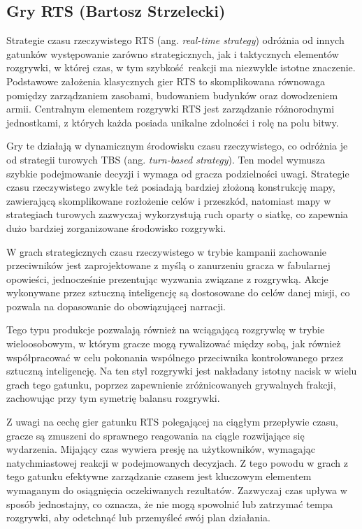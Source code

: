 \subsection{Gry RTS (Bartosz Strzelecki)}\label{ss:rts}
Strategie czasu rzeczywistego RTS (ang. \textit{real-time strategy}) odróżnia od innych gatunków występowanie zarówno strategicznych, jak i taktycznych
elementów rozgrywki, w której czas, w tym szybkość reakcji ma niezwykle istotne znaczenie. Podstawowe założenia klasycznych gier RTS to skomplikowana równowaga pomiędzy zarządzaniem zasobami, budowaniem budynków oraz
dowodzeniem armii. Centralnym elementem rozgrywki RTS jest zarządzanie różnorodnymi jednostkami, z których każda posiada unikalne zdolności i rolę na polu bitwy.

Gry te działają w dynamicznym środowisku czasu rzeczywistego, co odróżnia je od strategii turowych TBS (ang. \textit{turn-based strategy}). Ten model wymusza szybkie podejmowanie decyzji
i wymaga od gracza podzielności uwagi. Strategie czasu rzeczywistego zwykle też posiadają bardziej złożoną konstrukcję mapy, zawierającą skomplikowane
rozłożenie celów i przeszkód, natomiast mapy w strategiach turowych zazwyczaj wykorzystują ruch oparty o siatkę, co zapewnia dużo bardziej
zorganizowane środowisko rozgrywki.

W grach strategicznych czasu rzeczywistego w trybie kampanii zachowanie przeciwników jest zaprojektowane z myślą o zanurzeniu gracza w fabularnej opowieści, jednocześnie
prezentując wyzwania związane z rozgrywką. Akcje wykonywane przez sztuczną inteligencję są dostosowane do celów danej misji, co pozwala
na dopasowanie do obowiązującej narracji.

Tego typu produkcje pozwalają również na wciągającą rozgrywkę w trybie wieloosobowym, w którym gracze mogą rywalizować między sobą, jak również
współpracować w celu pokonania wspólnego przeciwnika kontrolowanego przez sztuczną inteligencję. Na ten styl rozgrywki jest nakładany istotny nacisk
w wielu grach tego gatunku, poprzez zapewnienie zróżnicowanych grywalnych frakcji, zachowując przy tym symetrię balansu rozgrywki.

Z uwagi na cechę gier gatunku RTS polegającej na ciągłym przepływie czasu, gracze są zmuszeni
do sprawnego reagowania na ciągle rozwijające się wydarzenia. Mijający czas
wywiera presję na użytkowników, wymagając natychmiastowej reakcji w podejmowanych decyzjach.
Z tego powodu w grach z tego gatunku efektywne zarządzanie czasem jest kluczowym elementem
wymaganym do osiągnięcia oczekiwanych rezultatów. Zazwyczaj czas upływa w sposób jednostajny, co oznacza, że
nie mogą spowolnić lub zatrzymać tempa rozgrywki, aby odetchnąć lub przemyśleć swój plan działania.

